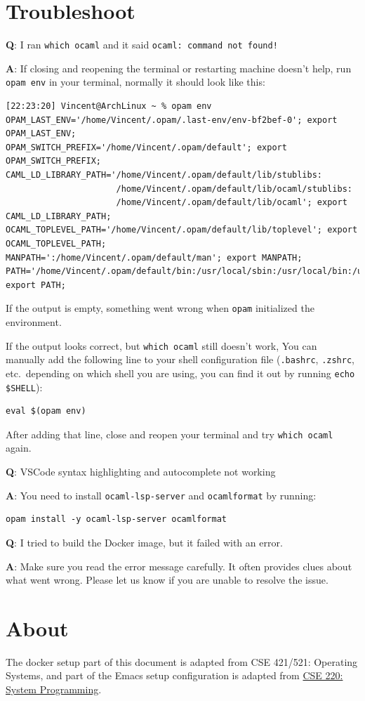 \documentclass{extarticle}
\begin{document}
\newpage
\section{Troubleshoot}\label{Troubleshoot}
\textbf{Q}: I ran \texttt{which ocaml} and it said \texttt{ocaml: command not found!}

\textbf{A}: If closing and reopening the terminal or restarting machine doesn't help,
run \texttt{opam env} in your terminal, normally it should look like this:
\begin{lstlisting}
[22:23:20] Vincent@ArchLinux ~ % opam env 
OPAM_LAST_ENV='/home/Vincent/.opam/.last-env/env-bf2bef-0'; export OPAM_LAST_ENV; 
OPAM_SWITCH_PREFIX='/home/Vincent/.opam/default'; export OPAM_SWITCH_PREFIX; 
CAML_LD_LIBRARY_PATH='/home/Vincent/.opam/default/lib/stublibs:
                      /home/Vincent/.opam/default/lib/ocaml/stublibs:
                      /home/Vincent/.opam/default/lib/ocaml'; export CAML_LD_LIBRARY_PATH; 
OCAML_TOPLEVEL_PATH='/home/Vincent/.opam/default/lib/toplevel'; export OCAML_TOPLEVEL_PATH; 
MANPATH=':/home/Vincent/.opam/default/man'; export MANPATH;
PATH='/home/Vincent/.opam/default/bin:/usr/local/sbin:/usr/local/bin:/usr/bin'; export PATH;
\end{lstlisting}
If the output is empty, something went wrong when \texttt{opam} initialized the environment.

If the output looks correct, but \texttt{which ocaml} still doesn't work,
You can manually add the following line to your shell configuration file
(\texttt{.bashrc}, \texttt{.zshrc}, etc.\ depending on which shell you are using,
you can find it out by running \texttt{echo \$SHELL}):
\begin{lstlisting}
eval $(opam env)
\end{lstlisting}
After adding that line, close and reopen your terminal and try \texttt{which ocaml} again.

\textbf{Q}: VSCode syntax highlighting and autocomplete not working

\textbf{A}: You need to install \texttt{ocaml-lsp-server} and \texttt{ocamlformat} by running:
\begin{lstlisting}
opam install -y ocaml-lsp-server ocamlformat
\end{lstlisting}

\textbf{Q}: I tried to build the Docker image, but it failed with an error.

\textbf{A}: Make sure you read the error message carefully.
It often provides clues about what went wrong.
Please let us know if you are unable to resolve the issue.

\newpage
\section{About}
The docker setup part of this document is adapted from CSE 421/521: Operating Systems,
and part of the Emacs setup configuration is adapted from \href{https://github.com/ub-cse220/emacs-config}{CSE 220: System Programming}.
\end{document}
